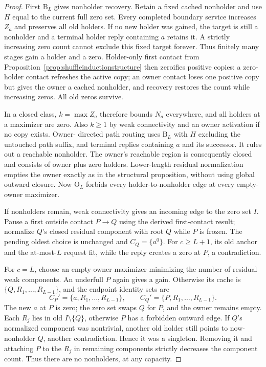 \documentclass[11pt]{article}
\begin{document}
\begin{proof}
First $\mathrm B_L$ gives nonholder recovery. Retain a fixed
cached nonholder and use $H$ equal to the current full zero set.
Every completed boundary service increases $Z_a$ and preserves
all old holders. If no new holder was gained, the target is
still a nonholder and a terminal holder reply containing $a$
retains it. A strictly increasing zero count cannot exclude
this fixed target forever. Thus finitely many stages gain a
holder and a zero. Holder-only first contact from
Proposition~\ref{prop:shuffleinductionstructure} then zeroifies
positive copies: a zero-holder contact refreshes the active
copy; an owner contact loses one positive copy but gives the
owner a cached nonholder, and recovery restores the count
while increasing zeros. All old zeros survive.

In a closed class, $k=\max Z_a$ therefore bounds $N_a$ everywhere,
and all holders at a maximizer are zero. Also $k\ge1$ by weak
connectivity and an owner activation if no copy exists. Owner-
directed path routing uses $\mathrm B_L$ with $H$ excluding the
untouched path suffix, and terminal replies containing $a$ and
its successor. It rules out a reachable nonholder. The owner's
reachable region is consequently closed and consists of owner
plus zero holders. Lower-length residual normalization empties
the owner exactly as in the structural proposition, without
using global outward closure. Now $\mathrm O_L$ forbids every
holder-to-nonholder edge at every empty-owner maximizer.

If nonholders remain, weak connectivity gives an incoming edge
to the zero set $I$. Pause a first outside contact $P\to Q$
using the derived first-contact result; normalize $Q$'s closed
residual component with root $Q$ while $P$ is frozen. The pending
oldest choice is unchanged and $C_Q=\{a^0\}$. For $c\ge L+1$,
its old anchor and the at-most-$L$ request fit, while the reply
creates a zero at $P$, a contradiction.

For $c=L$, choose an empty-owner maximizer minimizing the number
of residual weak components. An underfull $P$ again gives a gain.
Otherwise its cache is $\{Q,R_1,\ldots,R_{L-1}\}$, and the endpoint
identity sets are
\[
 C_P'=\{a,R_1,\ldots,R_{L-1}\},\qquad
 C_Q'=\{P,R_1,\ldots,R_{L-1}\}.
\]
The new $a$ at $P$ is zero; the zero set swaps $Q$ for $P$, and
the owner remains empty. Each $R_j$ lies in old $I\setminus\{Q\}$,
otherwise $P$ has a forbidden outward edge. If $Q$'s normalized
component was nontrivial, another old holder still points to
now-nonholder $Q$, another contradiction. Hence it was a singleton.
Removing it and attaching $P$ to the $R_j$ in remaining components
strictly decreases the component count. Thus there are no
nonholders, at any capacity.


\end{proof}
\end{document}
